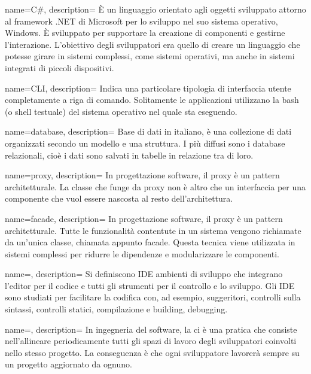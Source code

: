 {
  name=C\#,
  description={ È un linguaggio orientato agli oggetti sviluppato attorno al framework .NET di Microsoft per lo sviluppo nel suo sistema
  operativo, Windows. È sviluppato per supportare la creazione di componenti e gestirne l'interazione. L'obiettivo degli sviluppatori era
  quello di creare un linguaggio che potesse girare in sistemi complessi, come sistemi operativi, ma anche in sistemi integrati di piccoli dispositivi.}
}

{
  name=CLI,
  description={ Indica una particolare tipologia di interfaccia utente completamente a riga di comando. Solitamente le applicazioni
  utilizzano la bash (o shell testuale) del sistema operativo nel quale sta eseguendo. }
}

{
  name=database,
  description={ Base di dati in italiano, è una collezione di dati organizzati secondo un modello e una struttura. I più diffusi sono i
  database relazionali, cioè i dati sono salvati in tabelle in relazione tra di loro. }
}

{
  name={proxy},
  description={ In progettazione software, il proxy è un pattern architetturale. La classe che funge da proxy non è altro che un interfaccia
  per una componente che vuol essere nascosta al resto dell'architettura. }
}

{
  name={facade},
  description={ In progettazione software, il proxy è un pattern architetturale. Tutte le funzionalità contentute in un sistema vengono
  richiamate da un'unica classe, chiamata appunto facade. Questa tecnica viene utilizzata in sistemi complessi per ridurre le dipendenze e
  modularizzare le componenti. }
}

{
  name=,
  description={ Si definiscono IDE ambienti di sviluppo che integrano l'editor per il codice e tutti gli strumenti per il controllo e lo
  sviluppo. Gli IDE sono studiati per facilitare la codifica con, ad esempio, suggeritori, controlli sulla sintassi, controlli statici,
  compilazione e building, debugging.  }
}

{
  name=,
  description={ In ingegneria del software, la \acrlong{ci} è una pratica che consiste nell'allineare periodicamente tutti gli spazi di
  lavoro degli sviluppatori coinvolti nello stesso progetto. La conseguenza è che ogni sviluppatore lavorerà sempre su un progetto
  aggiornato da ognuno. }
}

